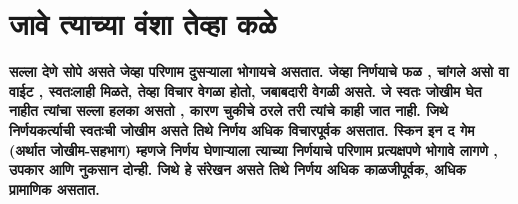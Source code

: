 \chapter{जावे त्याच्या वंशा तेव्हा कळे}

\textcolor{blue!60!black}{\textbf{सल्ला देणे सोपे असते जेव्हा परिणाम दुसऱ्याला भोगायचे असतात. जेव्हा निर्णयाचे फळ , चांगले असो वा वाईट , स्वतःलाही मिळते, तेव्हा विचार वेगळा होतो, जबाबदारी वेगळी असते. जे स्वतः जोखीम घेत नाहीत त्यांचा सल्ला हलका असतो , कारण चुकीचे ठरले तरी त्यांचे काही जात नाही. जिथे निर्णयकर्त्याची स्वतःची जोखीम असते तिथे निर्णय अधिक विचारपूर्वक असतात. स्किन इन द गेम (अर्थात जोखीम-सहभाग) म्हणजे निर्णय घेणाऱ्याला त्याच्या निर्णयाचे परिणाम प्रत्यक्षपणे भोगावे लागणे , उपकार आणि नुकसान दोन्ही. जिथे हे संरेखन असते तिथे निर्णय अधिक काळजीपूर्वक, अधिक प्रामाणिक असतात.}}

